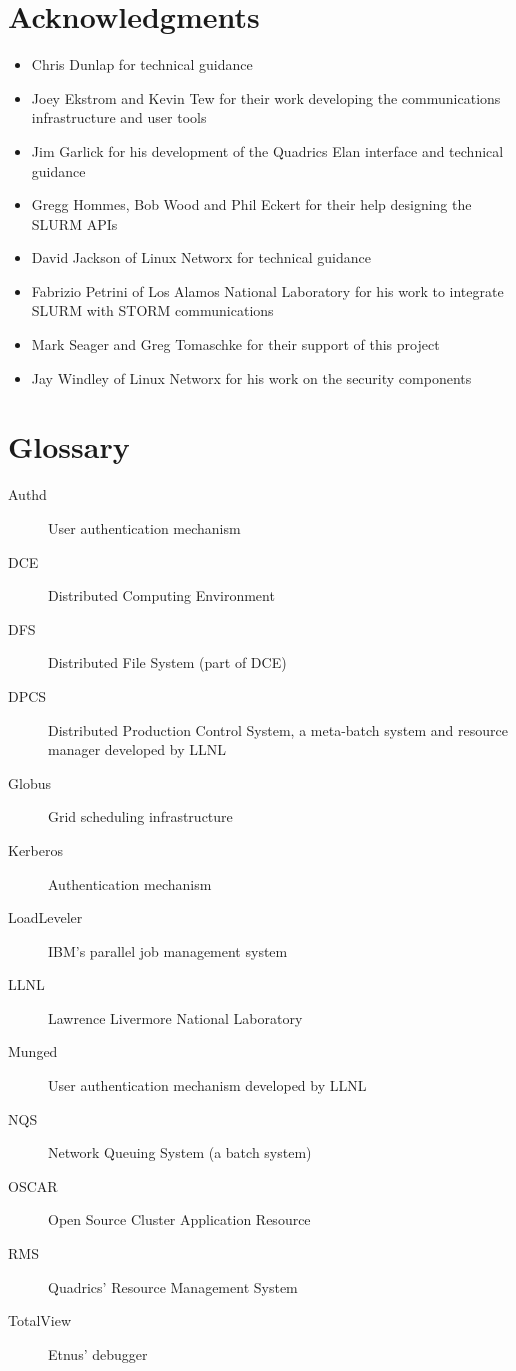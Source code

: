 \section{Acknowledgments}

\begin{itemize}
\item Chris Dunlap for technical guidance
\item Joey Ekstrom and Kevin Tew for their work developing the communications
infrastructure and user tools
\item Jim Garlick for his development of the Quadrics Elan interface and 
technical guidance
\item Gregg Hommes, Bob Wood and Phil Eckert for their help designing the 
SLURM APIs
\item David Jackson of Linux Networx for technical guidance
\item Fabrizio Petrini of Los Alamos National Laboratory for his work to 
integrate SLURM with STORM communications 
\item Mark Seager and Greg Tomaschke for their support of this project
\item Jay Windley of Linux Networx for his work on the security components
\end{itemize}

\appendix
\newpage

\section{Glossary}

\begin{description}
\item[Authd]    User authentication mechanism
\item[DCE]	Distributed Computing Environment
\item[DFS]	Distributed File System (part of DCE)
\item[DPCS]	Distributed Production Control System, a meta-batch system 
		and resource manager developed by LLNL
\item[Globus]	Grid scheduling infrastructure
\item[Kerberos]	Authentication mechanism
\item[LoadLeveler] IBM's parallel job management system
\item[LLNL]	Lawrence Livermore National Laboratory
\item[Munged]   User authentication mechanism developed by LLNL
\item[NQS]	Network Queuing System (a batch system)
\item[OSCAR]	Open Source Cluster Application Resource
\item[RMS]	Quadrics' Resource Management System
\item[TotalView] Etnus' debugger
\end{description}

\newpage


